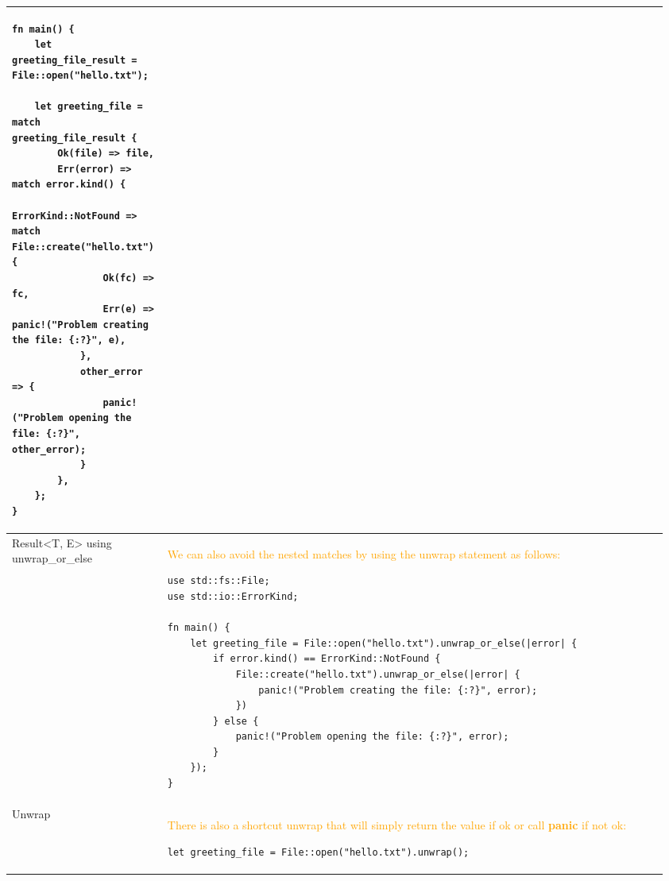\documentclass[main.tex,fontsize=8pt,paper=a4,paper=portrait,DIV=calc,]{scrartcl}
\begin{document}
\begin{table}[ht!]
\begin{tabular}{|m{0.2\linewidth}|m{0.755\linewidth}|}
\begin{lstlisting}
fn main() {
    let greeting_file_result = File::open("hello.txt");

    let greeting_file = match greeting_file_result {
        Ok(file) => file,
        Err(error) => match error.kind() {
            ErrorKind::NotFound => match File::create("hello.txt") {
                Ok(fc) => fc,
                Err(e) => panic!("Problem creating the file: {:?}", e),
            },
            other_error => {
                panic!("Problem opening the file: {:?}", other_error);
            }
        },
    };
}
\end{lstlisting}\\
\hline
Result<T, E> using unwrap\_or\_else &
\textcolor{orange}{We can also avoid the nested matches by using the unwrap statement as follows:}\newline
\begin{lstlisting}
use std::fs::File;
use std::io::ErrorKind;

fn main() {
    let greeting_file = File::open("hello.txt").unwrap_or_else(|error| {
        if error.kind() == ErrorKind::NotFound {
            File::create("hello.txt").unwrap_or_else(|error| {
                panic!("Problem creating the file: {:?}", error);
            })
        } else {
            panic!("Problem opening the file: {:?}", error);
        }
    });
}
\end{lstlisting}\\
\hline
Unwrap & 
\textcolor{orange}{There is also a shortcut unwrap that will simply return the value if ok or call \textbf{panic} if not ok:}\newline
\begin{lstlisting}
let greeting_file = File::open("hello.txt").unwrap();
\end{lstlisting}\\
\hline
\end{tabular}
\end{table}
\pagebreak
\end{document}
